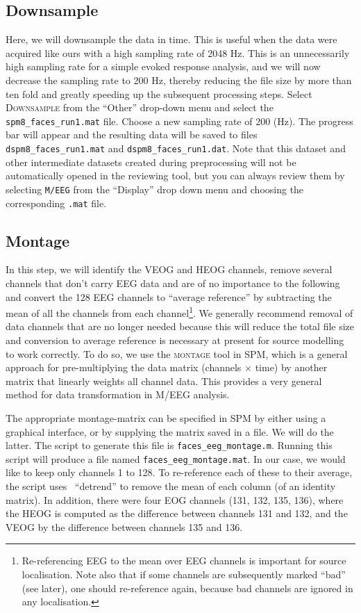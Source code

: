 \subsection{Downsample}

Here, we will downsample the data in time. This is useful when the data were acquired like ours with a high sampling rate of 2048 Hz. This is an unnecessarily high sampling rate for a simple evoked response analysis, and we will now decrease the sampling rate to 200 Hz, thereby reducing the file size by more than ten fold and greatly speeding up the subsequent processing steps. Select \textsc{Downsample} from the ``Other'' drop-down menu and select the \texttt{spm8\_faces\_run1.mat} file. Choose a new sampling rate of 200 (Hz). The progress bar will appear and the resulting data will be saved to files \texttt{dspm8\_faces\_run1.mat} and \texttt{dspm8\_faces\_run1.dat}. Note that this dataset and other intermediate datasets created during preprocessing will not be automatically opened in the reviewing tool, but you can always review them by selecting \texttt{M/EEG} from the ``Display'' drop down menu and choosing the corresponding \texttt{.mat} file.

\subsection{Montage}

In this step, we will identify the VEOG and HEOG channels, remove several channels that don't carry EEG data and are of no importance to the following and convert the 128 EEG channels to ``average reference'' by subtracting the mean of all the channels from each channel\footnote{Re-referencing EEG to the mean over EEG channels is important for source localisation. Note also that if some channels are subsequently marked ``bad'' (see later), one should re-reference again, because bad channels are ignored in any localisation.}. We generally recommend removal of data channels that are no longer needed because this will reduce the total file size and conversion to average reference is necessary at present for source modelling to work correctly. To do so, we use the \textsc{montage} tool in SPM, which is a general approach for pre-multiplying the data matrix (channels $\times$ time) by another matrix that linearly weights all channel data. This provides a very general method for data transformation in M/EEG analysis.

The appropriate montage-matrix can be specified in SPM by either using a graphical interface, or by supplying the matrix saved in a file. We will do the latter. The script to generate this file is \texttt{faces\_eeg\_montage.m}. Running this script will produce a file named \texttt{faces\_eeg\_montage.mat}. In our case, we would like to keep only channels 1 to 128. To re-reference each of these to their average, the script uses \matlab\ ``detrend'' to remove the mean of each column (of an identity matrix). In addition, there were four EOG channels (131, 132, 135, 136), where the HEOG is computed as the difference between channels 131 and 132, and the VEOG by the difference between channels 135 and 136. 

